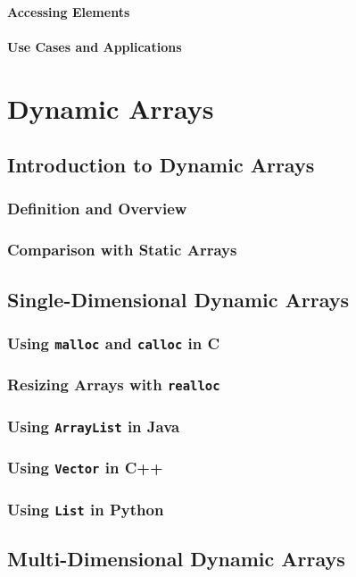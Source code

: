 \documentclass{book}
\begin{document}
	\subsubsection{Accessing Elements}
	\subsubsection{Use Cases and Applications}
	
	\chapter{Dynamic Arrays}
	\section{Introduction to Dynamic Arrays}
	\subsection{Definition and Overview}
	\subsection{Comparison with Static Arrays}
	
	\section{Single-Dimensional Dynamic Arrays}
	\subsection{Using \texttt{malloc} and \texttt{calloc} in C}
	\subsection{Resizing Arrays with \texttt{realloc}}
	\subsection{Using \texttt{ArrayList} in Java}
	\subsection{Using \texttt{Vector} in C++}
	\subsection{Using \texttt{List} in Python}
	
	\section{Multi-Dimensional Dynamic Arrays}
\end{document}
